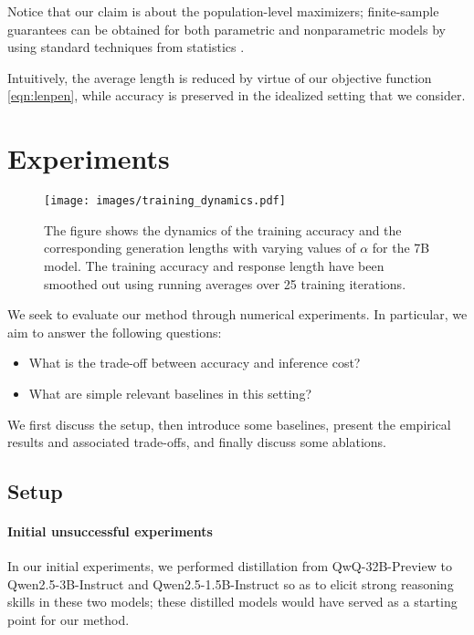 Notice that our claim is about the population-level maximizers; finite-sample guarantees can be obtained for both parametric and nonparametric models by using standard techniques from statistics \cite{wainwright2019high}. 

Intuitively, the average length is reduced by virtue of our objective function \eqref{eqn:lenpen}, while accuracy is preserved in the idealized setting that we consider.

\section{Experiments}

\begin{figure*}[h!]
\centering
\texttt{[image: images/training\_dynamics.pdf]}
\vspace{-0.3in}
\caption{The figure shows the dynamics of the training accuracy and the corresponding generation lengths with varying values of $\alpha$ for the 7B model. The training accuracy and response length have been smoothed out using running averages over 25 training iterations.} 
\label{fig:training_dynamics}
\end{figure*}


We seek to evaluate our method through numerical experiments.
In particular, we aim to answer the following questions:
\begin{itemize}
    \item What is the trade-off between  accuracy and inference cost?
    \item What are simple relevant baselines in this setting?
\end{itemize}

We first discuss the setup, then introduce some baselines, present the empirical results and associated trade-offs, and finally discuss some ablations.


\subsection{Setup}
\paragraph{Initial unsuccessful experiments}
In our initial experiments, 
we performed distillation from QwQ-32B-Preview to Qwen2.5-3B-Instruct and Qwen2.5-1.5B-Instruct so as to elicit strong reasoning skills in these two models; these distilled models would have served as a starting point for our method.

